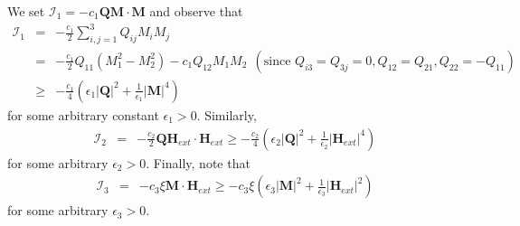 \documentclass{article}
\def\Qvec{\mathbf{Q}}
\def \Mvec{\mathbf{M}}
\def\Hvec{\mathbf{H}}
\begin{document}
We set $\mathcal{I}_1= -c_1\Qvec\Mvec\cdot\Mvec$ and observe that
\begin{eqnarray}
\mathcal{I}_1&=&-\frac{c_1}{2}\sum_{i,j=1}^{3}Q_{ij}M_iM_j \nonumber\\
&=&-\frac{c_1}{2}Q_{11}\left(M_1^2 - M_2^2\right) - c_1Q_{12}M_1M_2~~(\mbox{since } Q_{i3}=Q_{3j}=0,Q_{12}=Q_{21}, Q_{22}=-Q_{11})\nonumber\\
& \ge & -\frac{c_1}{4}\left(\epsilon_1|\Qvec|^2 + \frac{1}{\epsilon_1}|\Mvec|^4\right)\label{eq:ex1}
\end{eqnarray}
for some arbitrary constant $\epsilon_1>0$. Similarly, 
\begin{eqnarray}
\mathcal{I}_2 &=&  -\frac{c_2}{2}\Qvec\Hvec_{ext}\cdot\Hvec_{ext} 
\ge -\frac{c_2}{4}\left(\epsilon_2|\Qvec|^2 + \frac{1}{\epsilon_2}|\Hvec_{ext}|^4\right)\label{eq:ex2}
\end{eqnarray}
for some arbitrary $\epsilon_2>0$. Finally, note that \begin{eqnarray}
\mathcal{I}_3 &=& -c_3\xi\Mvec\cdot\Hvec_{ext} 
\ge-c_3\xi\left(\epsilon_3|\Mvec|^2 + \frac{1}{\epsilon_3}|\Hvec_{ext}|^2\right)\label{eq:ex3}
\end{eqnarray}
for some arbitrary $\epsilon_3>0$. 
\end{document}
